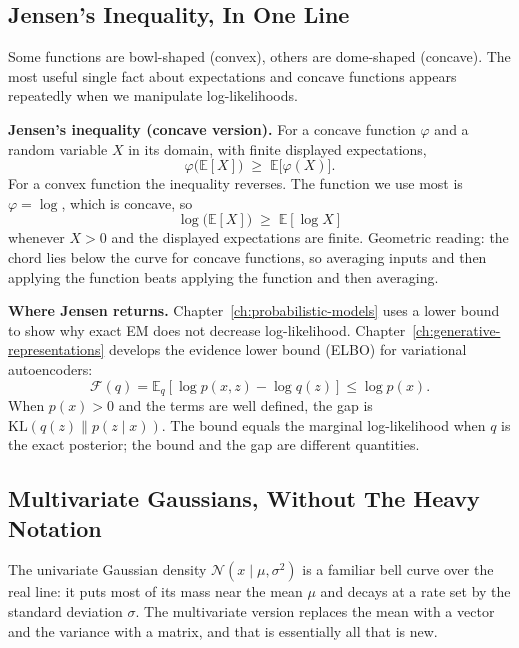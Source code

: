 \subsection*{Jensen's Inequality, In One Line}

Some functions are bowl-shaped (convex), others are dome-shaped (concave). The most useful single fact about expectations and concave functions appears repeatedly when we manipulate log-likelihoods.

\textbf{Jensen's inequality (concave version).} For a concave function \(\varphi\) and a random variable \(X\) in its domain, with finite displayed expectations,
\[
\varphi\bigl(\mathbb{E}[X]\bigr) \;\ge\; \mathbb{E}\bigl[\varphi(X)\bigr].
\]
For a convex function the inequality reverses. The function we use most is \(\varphi = \log\), which is concave, so
\[
\log\bigl(\mathbb{E}[X]\bigr) \;\ge\; \mathbb{E}[\log X]
\]
whenever \(X > 0\) and the displayed expectations are finite. Geometric reading: the chord lies below the curve for concave functions, so averaging inputs and then applying the function beats applying the function and then averaging.

\textbf{Where Jensen returns.} Chapter~\ref{ch:probabilistic-models} uses a lower bound to show why exact EM does not decrease log-likelihood. Chapter~\ref{ch:generative-representations} develops the evidence lower bound (ELBO) for variational autoencoders:
\[
\mathcal F(q)=\mathbb E_q[\log p(x,z)-\log q(z)]\leq\log p(x).
\]
When $p(x)>0$ and the terms are well defined, the gap is $\mathrm{KL}(q(z)\|p(z\mid x))$. The bound equals the marginal log-likelihood when $q$ is the exact posterior; the bound and the gap are different quantities.

\subsection*{Multivariate Gaussians, Without The Heavy Notation}

The univariate Gaussian density \(\mathcal{N}(x \mid \mu, \sigma^2)\) is a familiar bell curve over the real line: it puts most of its mass near the mean \(\mu\) and decays at a rate set by the standard deviation \(\sigma\). The multivariate version replaces the mean with a vector and the variance with a matrix, and that is essentially all that is new.

